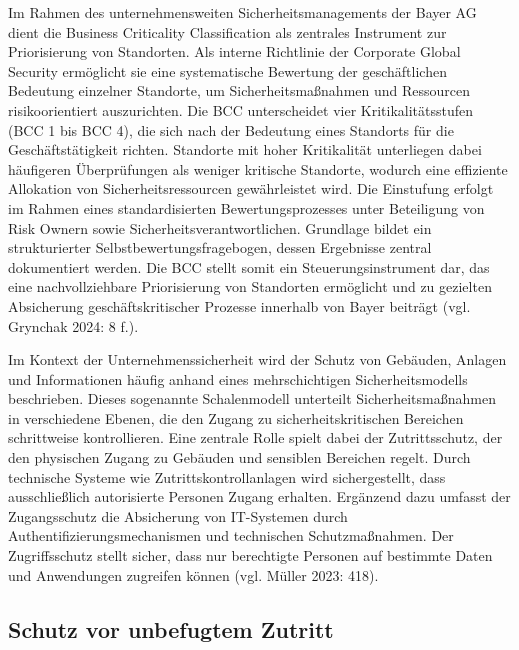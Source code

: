 \documentclass[
  12pt,
  a4paper,
  oneside,
  headings=normal,
  numbers=noendperiod
]{scrreprt}
\numberwithin{equation}{chapter}
\begin{document}
Im Rahmen des unternehmensweiten Sicherheitsmanagements der Bayer AG dient die
Business Criticality Classification als zentrales Instrument zur Priorisierung
von Standorten. Als interne Richtlinie der Corporate Global Security ermöglicht
sie eine systematische Bewertung der geschäftlichen Bedeutung einzelner
Standorte, um Sicherheitsmaßnahmen und Ressourcen risikoorientiert auszurichten.
Die BCC unterscheidet vier Kritikalitätsstufen (BCC 1 bis BCC 4), die sich nach
der Bedeutung eines Standorts für die Geschäftstätigkeit richten. Standorte mit
hoher Kritikalität unterliegen dabei häufigeren Überprüfungen als weniger
kritische Standorte, wodurch eine effiziente Allokation von
Sicherheitsressourcen gewährleistet wird. Die Einstufung erfolgt im Rahmen eines
standardisierten Bewertungsprozesses unter Beteiligung von Risk Ownern sowie
Sicherheitsverantwortlichen. Grundlage bildet ein strukturierter
Selbstbewertungsfragebogen, dessen Ergebnisse zentral dokumentiert werden. Die
BCC stellt somit ein Steuerungsinstrument dar, das eine nachvollziehbare
Priorisierung von Standorten ermöglicht und zu gezielten Absicherung
geschäftskritischer Prozesse innerhalb von Bayer beiträgt (vgl. Grynchak 2024:
8 f.).

Im Kontext der Unternehmenssicherheit wird der Schutz von Gebäuden, Anlagen und
Informationen häufig anhand eines mehrschichtigen Sicherheitsmodells
beschrieben. Dieses sogenannte Schalenmodell unterteilt Sicherheitsmaßnahmen in
verschiedene Ebenen, die den Zugang zu sicherheitskritischen Bereichen
schrittweise kontrollieren. Eine zentrale Rolle spielt dabei der Zutrittsschutz,
der den physischen Zugang zu Gebäuden und sensiblen Bereichen regelt. Durch
technische Systeme wie Zutrittskontrollanlagen wird sichergestellt, dass
ausschließlich autorisierte Personen Zugang erhalten. Ergänzend dazu umfasst der
Zugangsschutz die Absicherung von IT-Systemen durch
Authentifizierungsmechanismen und technischen Schutzmaßnahmen. Der
Zugriffsschutz stellt sicher, dass nur berechtigte Personen auf bestimmte Daten
und Anwendungen zugreifen können (vgl. Müller 2023: 418).

\clearpage

\label{test:subsections}
\setcounter{chapter}{2}
\setcounter{section}{3}
\setcounter{subsection}{1}
\subsection{Schutz vor unbefugtem Zutritt}
\end{document}
